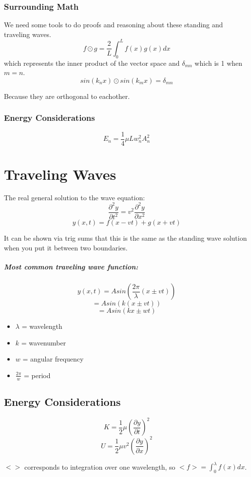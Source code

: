 \documentclass[a4paper,12pt]{report}
\begin{document}
\subsection{Surrounding Math}
We need some tools to do proofs and reasoning about these standing and traveling waves. 
$$f \odot g = \frac{2}{L} \int_0^L f(x)g(x) dx$$
which represents the inner product of the vector space and 
$\delta_{mn}$ which is 1 when $m=n$.
$$sin(k_n x) \odot sin(k_m x) = \delta_{mn}$$

Because they are orthogonal to eachother.

\subsection{Energy Considerations}
$$E_n = \frac{1}{4} \mu L w_n^2 A_n^2$$

\chapter{Traveling Waves}
The real general solution to the wave equation: 
$$\frac{\partial^2 y}{\partial t^2} = v^2 \frac{\partial^2 y}{\partial x^2}$$
$$y(x, t) = f(x-vt) + g(x+vt)$$

It can be shown via trig sums that this is the same as the standing wave solution when you 
put it between two boundaries.

\paragraph{Most common traveling wave function: } $$y(x, t) = A sin(\frac{2 \pi}{\lambda} (x \pm vt))$$
$$= A sin(k(x\pm vt))$$
$$= A sin(kx \pm wt)$$
\begin{itemize}
\item $\lambda$ = wavelength
\item $k$ = wavenumber
\item $w$ = angular frequency
\item $\frac{2\pi}{w}$ = period
\end{itemize}

\section{Energy Considerations}
$$K = \frac{1}{2} \mu (\frac{\partial y}{\partial t})^2$$
$$U = \frac{1}{2} \mu v^2 (\frac{\partial y}{\partial x})^2$$

$<>$ corresponds to integration over one wavelength, so $<f> = \int_0^{\lambda} f(x) dx$.
\end{document}
